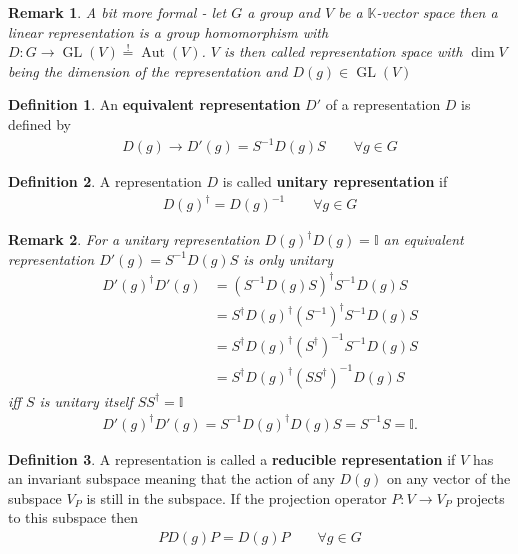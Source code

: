 \documentclass[10pt,a4paper]{article}
\newtheorem{remark}{Remark}[section]
\theoremstyle{definition}
\newtheorem{definition}{Definition}[section]
\DeclareMathOperator{\Aut}{Aut}
\DeclareMathOperator{\GL}{GL}
\begin{document}
\begin{remark}{}
A bit more formal - let $G$ a group and $V$ be a $\mathbb{K}$-vector space then a linear representation is a group homomorphism with
$D:G\rightarrow \GL(V)\overset{!}{=}\Aut(V)$. $V$ is then called representation space with $\dim V$ being the dimension of the representation and $D(g)\in\GL(V)$
\end{remark}

\begin{definition}{}
An {\bf equivalent representation} $D'$ of a representation $D$ is defined by 
\begin{align}
D(g)\rightarrow D'(g)=S^{-1}D(g)S   \qquad \forall g\in G
\end{align}
\end{definition}

\begin{definition}{}
A representation $D$ is called {\bf unitary representation} if 
\begin{align}
D(g)^\dagger=D(g)^{-1}    \qquad \forall g\in G
\end{align}
\end{definition}

\begin{remark}{}
For a unitary representation $D(g)^\dagger D(g)=\mathbb{I}$ an equivalent representation $D'(g)=S^{-1}D(g)S$ is only unitary
\begin{align}
    D'(g)^\dagger D'(g)&=\left(S^{-1}D(g)S\right)^\dagger S^{-1}D(g)S\\
    &=S^\dagger D(g)^\dagger (S^{-1})^\dagger S^{-1}D(g)S\\
    &=S^\dagger D(g)^\dagger (S^\dagger)^{-1} S^{-1}D(g)S\\
    &=S^\dagger D(g)^\dagger (SS^\dagger)^{-1} D(g)S
\end{align}
iff $S$ is unitary itself $SS^\dagger = \mathbb{I}$
\begin{align}
    D'(g)^\dagger D'(g)=S^{-1} D(g)^\dagger D(g)S = S^{-1} S = \mathbb{I}.
\end{align}
\end{remark}

\begin{definition}{}
A representation is called a {\bf reducible representation} if $V$ has an invariant subspace meaning that the action of any $D(g)$ on any vector of the subspace $V_P$ is still in the subspace. If the projection operator $P:V\rightarrow V_P$ projects to this subspace then
\begin{align}
PD(g)P=D(g)P   \qquad \forall g\in G
\end{align}
\end{definition}
\end{document}
